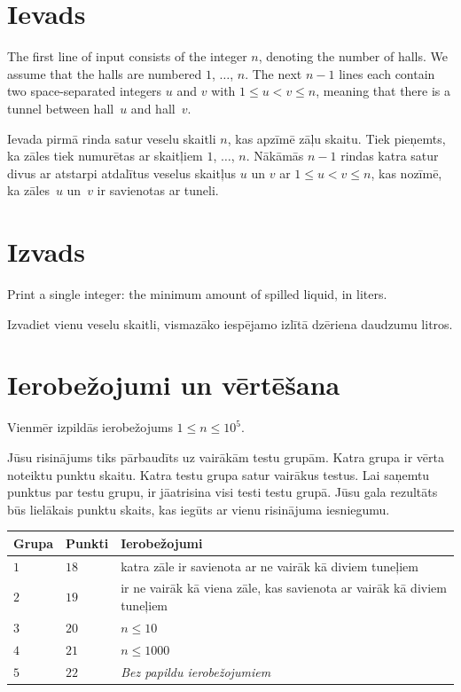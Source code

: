 \section*{Ievads}

The first line of input consists of the integer $n$, denoting the number of halls.
We assume that the halls are numbered $1$, $\ldots$, $n$.
The next $n-1$ lines each contain two space-separated integers $u$ and $v$ with 
$1\leq u < v \leq n$, %
meaning that there is a tunnel between hall~$u$ and hall~$v$.

Ievada pirmā rinda satur veselu skaitli $n$, kas apzīmē zāļu skaitu.
Tiek pieņemts, ka zāles tiek numurētas ar skaitļiem $1$, $\ldots$, $n$.
Nākāmās $n-1$ rindas katra satur divus ar atstarpi atdalītus veselus skaitļus $u$ un $v$ ar $1\leq u < v \leq n$, %
kas nozīmē, ka zāles~$u$ un~$v$ ir savienotas ar tuneli.

\section*{Izvads}

Print a single integer: the minimum amount of spilled liquid, in liters.

Izvadiet vienu veselu skaitli, vismazāko iespējamo izlītā dzēriena daudzumu litros.

\section*{Ierobežojumi un vērtēšana}

Vienmēr izpildās ierobežojums
$1\leq n\leq 10^5$. %

Jūsu risinājums tiks pārbaudīts uz vairākām testu grupām. Katra grupa ir vērta noteiktu punktu skaitu.
Katra testu grupa satur vairākus testus.
Lai saņemtu punktus par testu grupu, ir jāatrisina visi testi testu grupā.
Jūsu gala rezultāts būs lielākais punktu skaits, kas iegūts ar vienu risinājuma iesniegumu.

\medskip
\begin{tabular}{lll}
Grupa & Punkti & Ierobežojumi \\\hline
  $1$ & $18$ & katra zāle ir savienota ar ne vairāk kā diviem tuneļiem\\
  $2$ & $19$ & ir ne vairāk kā viena zāle, kas savienota ar vairāk kā diviem tuneļiem\\
  $3$ & $20$ & $n\leq 10$\\
  $4$ & $21$ & $n\leq 1000$\\
  $5$ & $22$ & \emph{Bez papildu ierobežojumiem}
\end{tabular}
